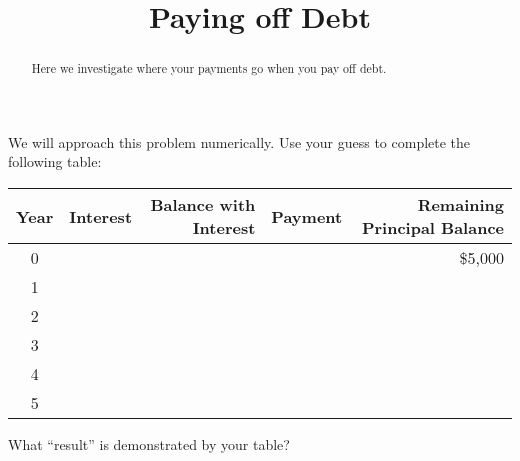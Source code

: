 \documentclass[,nooutcomes]{ximera}
\title{Paying off Debt}
\begin{document}
\begin{abstract}
Here we investigate where your payments go when you pay off debt.
\end{abstract}
\maketitle


\begin{question}
We will approach this problem numerically.  Use your guess to complete the following table:  

\def\arraystretch{2}
\begin{table}[h]
\begin{tabular}{|c|r|r|r|r|}
\hline
Year & Interest & Balance with Interest & Payment & Remaining Principal Balance \\ \hline
0    &          &                     &         & \$5,000                     \\ \hline
1    &          &                     &         &                             \\ \hline
2    &          &                     &         &                             \\ \hline
3    &          &                     &         &                             \\ \hline
4    &          &                     &         &                             \\ \hline
5    &          &                     &         &                             \\ \hline
\end{tabular}
\end{table}
What ``result'' is demonstrated by your table?  
\begin{freeResponse}
\end{freeResponse}
\end{question}
\end{document}
